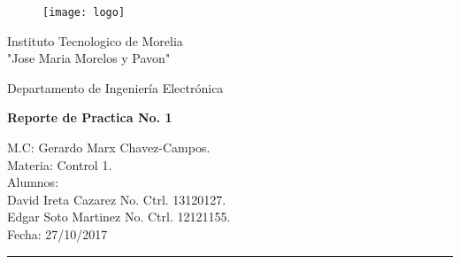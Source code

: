 \documentclass{report}
\newcounter{ns}
\begin{document}
	
	\begin{titlepage}
		
		\begin{center}
			\vspace*{-1in}
			\begin{figure}[htb]
				\begin{center}
					\texttt{[image: logo]}
				\end{center}
			\end{figure}
			
		\begin{large}
				Instituto Tecnologico de Morelia\\
				"Jose Maria Morelos y Pavon"\\
		\end{large}
			\vspace*{0.15in}
		\begin{large}
			Departamento de Ingeniería Electrónica\\
		\end{large}
			\vspace*{0.4in}
			
			\begin{Large}
				\textbf{Reporte de Practica No. 1} \\
			\end{Large}
			\vspace*{0.3in}
			\begin{large}
				M.C: Gerardo Marx Chavez-Campos.\\
				Materia: Control 1.\\
				Alumnos:\\
				 		David Ireta Cazarez No. Ctrl. 13120127.\\
						Edgar Soto Martinez No. Ctrl. 12121155.\\
				Fecha: 27/10/2017\\
			\end{large}
			\rule{80mm}{0.1mm}\\
			\vspace*{0.1in}
		\end{center}
		
	\end{titlepage}

	

	
	\chapter*{}
\end{document}
